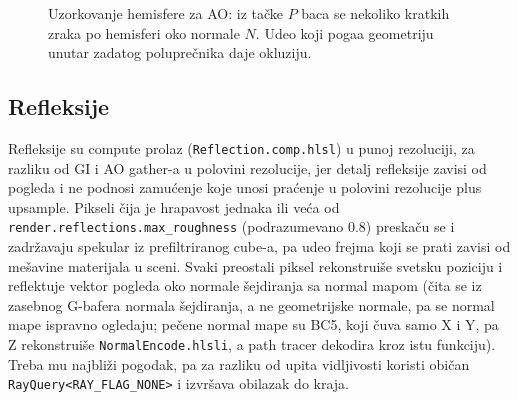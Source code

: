\begin{figure}[tbp]
\centering
{}
\caption[Uzorkovanje hemisfere za ambijentalnu okluziju]{Uzorkovanje hemisfere za AO: iz ta\v{c}ke $P$ baca se nekoliko kratkih zraka po hemisferi oko normale $N$. Udeo koji poga\dj{}a geometriju unutar zadatog polupre\v{c}nika daje okluziju.}
\label{fig:ao}
\end{figure}

\subsection{Refleksije}

Refleksije su compute prolaz (\texttt{Reflection.comp.hlsl}) u punoj rezoluciji, za razliku od GI i AO gather-a u polovini rezolucije, jer detalj refleksije zavisi od pogleda i ne podnosi zamu\'cenje koje unosi pra\'cenje u polovini rezolucije plus upsample. Pikseli \v{c}ija je hrapavost jednaka ili ve\'ca od \texttt{render.reflections.max\_roughness} (podrazumevano 0.8) preska\v{c}u se i zadr\v{z}avaju spekular iz prefiltriranog cube-a, pa udeo frejma koji se prati zavisi od me\v{s}avine materijala u sceni. Svaki preostali piksel rekonstrui\v{s}e svetsku poziciju i reflektuje vektor pogleda oko normale \v{s}ejdiranja sa normal mapom (\v{c}ita se iz zasebnog G-bafera normala \v{s}ejdiranja, a ne geometrijske normale, pa se normal mape ispravno ogledaju; pe\v{c}ene normal mape su BC5, koji \v{c}uva samo X i Y, pa Z rekonstrui\v{s}e \texttt{NormalEncode.hlsli}, a path tracer dekodira kroz istu funkciju). Treba mu najbli\v{z}i pogodak, pa za razliku od upita vidljivosti koristi obi\v{c}an \texttt{RayQuery<RAY_FLAG_NONE>} i izvr\v{s}ava obilazak do kraja.

